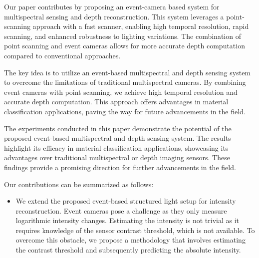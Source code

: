 Our paper contributes by proposing an event-camera based system for multispectral sensing and depth reconstruction. 
This system leverages a point-scanning approach with a fast scanner, enabling high temporal resolution, rapid scanning, and enhanced robustness to lighting variations. 
The combination of point scanning and event cameras allows for more accurate depth computation compared to conventional approaches.

The key idea is to utilize an event-based multispectral and depth sensing system to overcome the limitations of traditional multispectral cameras. 
By combining event cameras with point scanning, we achieve high temporal resolution and accurate depth computation. 
This approach offers advantages in material classification applications, paving the way for future advancements in the field.

The experiments conducted in this paper demonstrate the potential of the proposed event-based multispectral and depth sensing system. 
The results highlight its efficacy in material classification applications, showcasing its advantages over traditional multispectral or depth imaging sensors. 
These findings provide a promising direction for further advancements in the field.

Our contributions can be summarized as follows:
\begin{itemize}
    \item We extend the proposed event-based structured light setup for intensity reconstruction.
    Event cameras pose a challenge as they only measure logarithmic intensity changes. 
    Estimating the intensity is not trivial as it requires knowledge of the sensor contrast threshold, which is not available. 
    To overcome this obstacle, we propose a methodology that involves estimating the contrast threshold and subsequently predicting the absolute intensity.
\end{itemize}